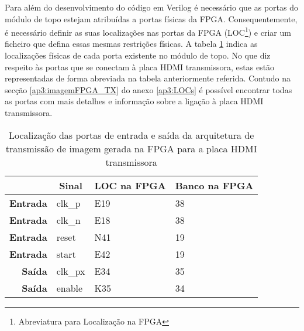 Para além do desenvolvimento do código em Verilog é necessário que as portas do módulo de topo estejam atribuídas a portas físicas da FPGA. Consequentemente, é necessário definir as suas localizações nas portas da FPGA (LOC\footnote{Abreviatura para Localização na FPGA}) e criar um ficheiro que defina essas mesmas restrições físicas. A tabela \ref{table:LOCplanA_simples} indica as localizações físicas de cada porta existente no módulo de topo. No que diz respeito às portas que se conectam à placa HDMI transmissora, estas estão representadas de forma abreviada na tabela anteriormente referida. Contudo na secção \ref{ap3:imagemFPGA_TX} do anexo \ref{ap3:LOCs} é possível encontrar todas as portas com mais detalhes e informação sobre a ligação à placa HDMI transmissora.

\begin{table}[h!]
	\centering
		\caption{Localização das portas de entrada e saída da arquitetura de transmissão de imagem gerada na FPGA para a placa HDMI transmissora}
	\label{table:LOCplanA_simples}
		\begin{tabular}{rlll}
			\hline
			\multicolumn{1}{c}{\textbf{}}         & \multicolumn{1}{c}{\textbf{Sinal}} & \multicolumn{1}{c}{\textbf{LOC na FPGA}} & \multicolumn{1}{c}{\textbf{Banco na FPGA}} \\ \hline
			\multicolumn{1}{r|}{\textbf{Entrada}} & clk\_p                             & E19                                      & 38                                         \\
			\multicolumn{1}{r|}{\textbf{Entrada}} & clk\_n                             & E18                                      & 38                                         \\
			\multicolumn{1}{r|}{\textbf{Entrada}} & reset                              & N41                                      & 19                                         \\
			\multicolumn{1}{r|}{\textbf{Entrada}} & start                              & E42                                      & 19                                         \\
			\multicolumn{1}{r|}{\textbf{Saída}}   & clk\_px                            & E34                                      & 35                                         \\
			\multicolumn{1}{r|}{\textbf{Saída}}   & enable                             & K35                                      & 34                                         \\

\end{tabular}
\end{table}
